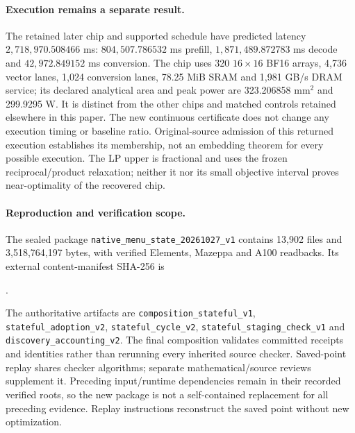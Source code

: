 \paragraph{Execution remains a separate result.}
The retained later chip and supported schedule have predicted latency
$2{,}718{,}970.508466$ ms: $804{,}507.786532$ ms prefill,
$1{,}871{,}489.872783$ ms decode and $42{,}972.849152$ ms conversion.
The chip uses 320 $16\times16$ BF16 arrays, 4,736 vector lanes,
1,024 conversion lanes, 78.25 MiB SRAM and 1,981 GB/s DRAM service;
its declared analytical area and peak power are 323.206858 mm$^2$ and
299.9295 W. It is distinct from the other chips and matched controls retained
elsewhere in this paper. The new continuous certificate does not change any
execution timing or baseline ratio. Original-source admission of this returned
execution establishes its membership, not an embedding theorem for every
possible execution. The LP upper is fractional and uses the frozen
reciprocal/product relaxation; neither it nor its small objective interval
proves near-optimality of the recovered chip.

\paragraph{Reproduction and verification scope.}
The sealed package \texttt{native\_menu\_state\_20261027\_v1} contains 13,902 files
and 3,518,764,197 bytes, with verified Elements, Mazeppa and A100 readbacks.
Its external content-manifest SHA-256 is
\begin{center}\small
{}.
\end{center}
The authoritative artifacts are \texttt{composition\_stateful\_v1},
\texttt{stateful\_adoption\_v2}, \texttt{stateful\_cycle\_v2},
\texttt{stateful\_staging\_check\_v1} and \texttt{discovery\_accounting\_v2}.
The final composition validates committed receipts and identities rather than
rerunning every inherited source checker. Saved-point replay shares checker
algorithms; separate mathematical/source reviews supplement it. Preceding
input/runtime dependencies remain in their recorded verified roots, so the
new package is not a self-contained replacement for all preceding evidence.
Replay instructions reconstruct the saved point without new optimization.
